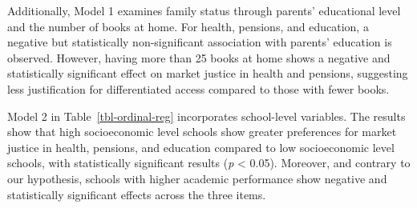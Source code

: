 \documentclass[
    behavsci,
    article,
    submit,
moreauthors
]{mdpi}
\begin{document}
Additionally, Model 1 examines family status through parents'
educational level and the number of books at home. For health, pensions,
and education, a negative but statistically non-significant association
with parents' education is observed. However, having more than 25 books
at home shows a negative and statistically significant effect on market
justice in health and pensions, suggesting less justification for
differentiated access compared to those with fewer books.

Model 2 in Table~\ref{tbl-ordinal-reg} incorporates school-level
variables. The results show that high socioeconomic level schools show
greater preferences for market justice in health, pensions, and
education compared to low socioeconomic level schools, with
statistically significant results (\emph{p} \textless{} 0.05). Moreover,
and contrary to our hypothesis, schools with higher academic performance
show negative and statistically significant effects across the three
items.
\end{document}

